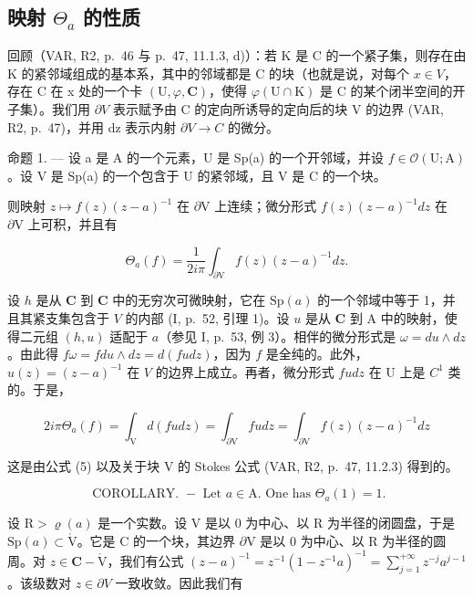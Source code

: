 \subsection{\texorpdfstring{映射 \(\Theta_{a}\) 的性质}{映射 \textbackslash Theta\_\{a\} 的性质}}

回顾（VAR, R2, p.~46 与 p.~47, 11.1.3, d)）：若 K 是 C 的一个紧子集，则存在由 K 的紧邻域组成的基本系，其中的邻域都是 C 的块（也就是说，对每个 \(x \in V\)，存在 C 在 x 处的一个卡 \((\mathrm{U}, \varphi, \mathbf{C})\)，使得 \(\varphi(\mathrm{U} \cap \mathrm{K})\) 是 C 的某个闭半空间的开子集）。我们用 \(\partial V\) 表示赋予由 C 的定向所诱导的定向后的块 V 的边界 (VAR, R2, p.~47)，并用 dz 表示内射 \(\partial V \to C\) 的微分。

命题 1. --- 设 a 是 A 的一个元素，U 是 Sp(a) 的一个开邻域，并设 \(f \in \mathcal{O}(\mathrm{U};\mathrm{A})\)。设 V 是 Sp(a) 的一个包含于 U 的紧邻域，且 V 是 C 的一个块。

则映射 \(z \mapsto f(z)(z - a)^{-1}\) 在 \(\partial\mathrm{V}\) 上连续；微分形式 \(f(z)(z - a)^{-1}dz\) 在 \(\partial\mathrm{V}\) 上可积，并且有

\[
\Theta_ {a} (f) = \frac {1}{2 i \pi} \int_ {\partial \mathrm{V}} f (z) (z - a) ^ {- 1} d z.
\]

设 \(h\) 是从 \(\mathbf{C}\) 到 \(\mathbf{C}\) 中的无穷次可微映射，它在 \(\mathrm{Sp}(a)\) 的一个邻域中等于 1，并且其紧支集包含于 \(V\) 的内部 (I, p.~52, 引理 1)。设 \(u\) 是从 \(\mathbf{C}\) 到 A 中的映射，使得二元组 \((h, u)\) 适配于 \(a\)（参见 I, p.~53, 例 3）。相伴的微分形式是 \(\omega = du \wedge dz\)。由此得 \(f\omega = fdu \wedge dz = d(fu dz)\)，因为 \(f\) 是全纯的。此外，\(u(z) = (z - a)^{-1}\) 在 \(V\) 的边界上成立。再者，微分形式 \(fu dz\) 在 U 上是 \(C^1\) 类的。于是，

\[
2 i \pi \Theta_ {a} (f) = \int_ {\mathrm{V}} d (f u d z) = \int_ {\partial \mathrm{V}} f u d z = \int_ {\partial \mathrm{V}} f (z) (z - a) ^ {- 1} d z
\]

这是由公式 (5) 以及关于块 V 的 Stokes 公式 (VAR, R2, p.~47, 11.2.3) 得到的。

\[
\text { COROLLARY. } - \text {   Let   } a \in \mathrm{A}. \text {   One has   } \Theta_ {a} (1) = 1.
\]

设 \(\mathrm{R} > \varrho(a)\) 是一个实数。设 V 是以 0 为中心、以 R 为半径的闭圆盘，于是 \(\mathrm{Sp}(a) \subset \mathring{\mathrm{V}}\)。它是 C 的一个块，其边界 \(\partial\mathrm{V}\) 是以 0 为中心、以 R 为半径的圆周。对 \(z \in \mathbf{C} - \mathring{\mathrm{V}}\)，我们有公式 \((z - a)^{-1} = z^{-1}(1 - z^{-1}a)^{-1} = \sum_{j=1}^{+\infty} z^{-j} a^{j-1}\)。该级数对 \(z \in \partial V\) 一致收敛。因此我们有

